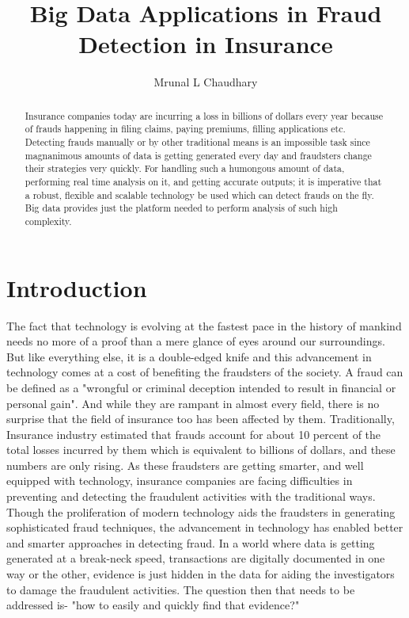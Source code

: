 \documentclass[sigconf]{acmart}
\begin{document}
\title{Big Data Applications in Fraud Detection in Insurance}


\author{Mrunal L Chaudhary}

\renewcommand{\shortauthors}{B. Trovato et al.}


\begin{abstract}
Insurance companies today are incurring a loss in billions of dollars every year because of frauds happening in filing claims, paying premiums, filling applications etc. Detecting frauds manually or by other traditional means is an impossible task since magnanimous amounts of data is getting generated every day and fraudsters change their strategies very quickly. For handling such a humongous amount of data, performing real time analysis on it, and getting accurate outputs; it is imperative that a robust, flexible and scalable technology be used which can detect frauds on the fly. Big data provides just the platform needed to perform analysis of such high complexity.
\end{abstract}



\maketitle

\section{Introduction}
The fact that technology is evolving at the fastest pace in the history of mankind needs no more of a proof than a mere glance of eyes around our surroundings. But like everything else, it is a double-edged knife and this advancement in technology comes at a cost of benefiting the fraudsters of the society. A fraud can be defined as a "wrongful or criminal deception intended to result in financial or personal gain". And while they are rampant in almost every field, there is no surprise that the field of insurance too has been affected by them. Traditionally, Insurance industry estimated that frauds account for about 10 percent of the total losses incurred by them which is equivalent to billions of dollars, and these numbers are only rising.\cite{link1} As these fraudsters are getting smarter, and well equipped with technology, insurance companies are facing difficulties in preventing and detecting the fraudulent activities with the traditional ways. Though the proliferation of modern technology aids the fraudsters in generating sophisticated fraud techniques, the advancement in technology has enabled better and smarter approaches in detecting fraud. In a world where data is getting generated at a break-neck speed, transactions are digitally documented in one way or the other, evidence is just hidden in the data for aiding the investigators to damage the fraudulent activities. The question then that needs to be addressed is- "how to easily and quickly find that evidence?"\cite{link4}
\end{document}
